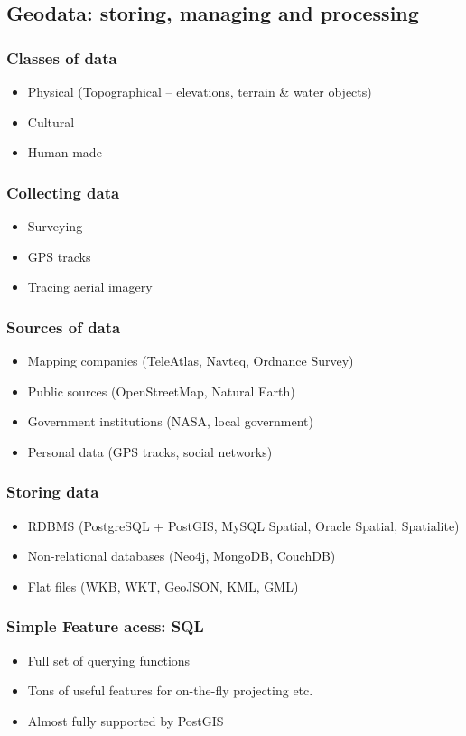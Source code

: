 \documentclass{beamer}
\begin{document}
\subsection{Geodata: storing, managing and processing }

\begin{frame}
  \frametitle{Classes of data}
  \begin{itemize}
  \item Physical (Topographical -- elevations, terrain \& water objects)
  \item Cultural
  \item Human-made
  \end{itemize}
\end{frame}

\begin{frame}
  \frametitle{Collecting data}
  \begin{itemize}
  \item Surveying
  \item GPS tracks
  \item Tracing aerial imagery
  \end{itemize}
\end{frame}

\begin{frame}
  \frametitle{Sources of data}
  \begin{itemize}
  \item Mapping companies (TeleAtlas, Navteq, Ordnance Survey)
  \item Public sources (OpenStreetMap, Natural Earth)
  \item Government institutions (NASA, local government)
  \item Personal data (GPS tracks, social networks)
  \end{itemize}
\end{frame}

\begin{frame}
  \frametitle{Storing data}
  \begin{itemize}
  \item RDBMS (PostgreSQL + PostGIS, MySQL Spatial, Oracle Spatial, Spatialite)
  \item Non-relational databases (Neo4j, MongoDB, CouchDB)
  \item Flat files (WKB, WKT, GeoJSON, KML, GML)
  \end{itemize}
\end{frame}

\begin{frame}
  \frametitle{Simple Feature acess: SQL}
  \begin{itemize}
  \item Full set of querying functions
  \item Tons of useful features for on-the-fly projecting etc.
  \item Almost fully supported by PostGIS
  \end{itemize}
\end{frame}
\end{document}

